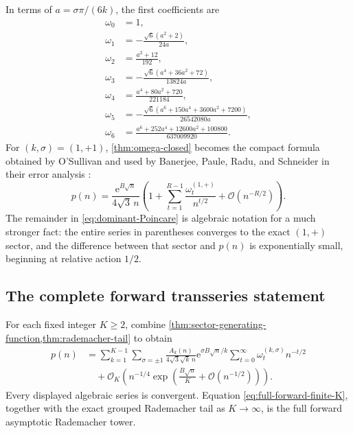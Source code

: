 \documentclass[11pt]{article}
\numberwithin{equation}{section}
\theoremstyle{mainthm}
\theoremstyle{defstyle}
\theoremstyle{remark}
\newcommand{\e}{\mathrm e}
\newcommand{\cO}{\mathcal O}
\begin{document}
In terms of \(a=\sigma\pi/(6k)\), the first coefficients are
\begin{align}
 \omega_0&=1,\nonumber\\
 \omega_1&=-\frac{\sqrt6(a^2+2)}{24a},\nonumber\\
 \omega_2&=\frac{a^2+12}{192},\nonumber\\
 \omega_3&=-\frac{\sqrt6(a^4+36a^2+72)}{13824a},\label{eq:omega-low}\\
 \omega_4&=\frac{a^4+80a^2+720}{221184},\nonumber\\
 \omega_5&=-\frac{\sqrt6(a^6+150a^4+3600a^2+7200)}{26542080a},\nonumber\\
 \omega_6&=\frac{a^6+252a^4+12600a^2+100800}{637009920}.\nonumber
\end{align}
For \((k,\sigma)=(1,+1)\), \cref{thm:omega-closed} becomes the compact formula obtained by O'Sullivan and used by Banerjee, Paule, Radu, and Schneider in their error analysis \cite{OSullivanBell,BanerjeeEtAl}:
\begin{equation}\label{eq:dominant-Poincare}
 p(n)=\frac{\e^{B\sqrt n}}{4\sqrt3\,n}
 \left(1+\sum_{t=1}^{R-1}\frac{\omega_t^{(1,+)}}{n^{t/2}}
 +\cO(n^{-R/2})\right).
\end{equation}
The remainder in \eqref{eq:dominant-Poincare} is algebraic notation for a much stronger fact: the entire series in parentheses converges to the exact \((1,+)\) sector, and the difference between that sector and \(p(n)\) is exponentially small, beginning at relative action \(1/2\).

\subsection{The complete forward transseries statement}

For each fixed integer \(K\ge2\), combine \cref{thm:sector-generating-function,thm:rademacher-tail} to obtain
\begin{align}
 p(n)
 &=\sum_{k=1}^{K-1}\sum_{\sigma=\pm1}
 \frac{A_k(n)}{4\sqrt3\sqrt{k}\,n}
 \e^{\sigma B\sqrt n/k}
 \sum_{t=0}^{\infty}\omega_t^{(k,\sigma)}n^{-t/2}
 \nonumber\\
 &\quad+\cO_K\!\left(n^{-1/4}
 \exp\!\left(\frac{B\sqrt n}{K}+\cO(n^{-1/2})\right)\right).
 \label{eq:full-forward-finite-K}
\end{align}
Every displayed algebraic series is convergent.  Equation \eqref{eq:full-forward-finite-K}, together with the exact grouped Rademacher tail as \(K\to\infty\), is the full forward asymptotic Rademacher tower.
\end{document}
